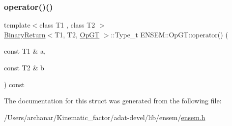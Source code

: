 \subsubsection{\texorpdfstring{operator()()}{operator()()}\hspace{0.1cm}{\footnotesize\ttfamily [3/3]}}
{\footnotesize\ttfamily template$<$class T1 , class T2 $>$ \\
\mbox{\hyperlink{structENSEM_1_1BinaryReturn}{Binary\+Return}}$<$T1, T2, \mbox{\hyperlink{structENSEM_1_1OpGT}{Op\+GT}} $>$\+::Type\+\_\+t E\+N\+S\+E\+M\+::\+Op\+G\+T\+::operator() (\begin{DoxyParamCaption}\item[{const T1 \&}]{a,  }\item[{const T2 \&}]{b }\end{DoxyParamCaption}) const\hspace{0.3cm}{\ttfamily [inline]}}



The documentation for this struct was generated from the following file\+:\begin{DoxyCompactItemize}
\item 
/\+Users/archanar/\+Kinematic\+\_\+factor/adat-\/devel/lib/ensem/\mbox{\hyperlink{adat-devel_2lib_2ensem_2ensem_8h}{ensem.\+h}}\end{DoxyCompactItemize}
